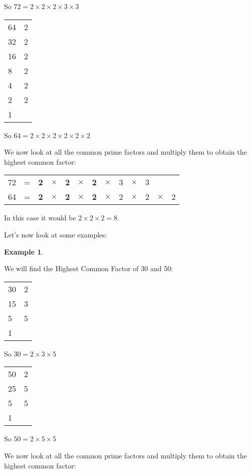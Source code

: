\documentclass[11pt, oneside]{article}
\theoremstyle{definition}
\newtheorem{exmp}{Example}[section]
\begin{document}
So $72 = 2 \times 2 \times 2 \times 3 \times 3$

\bigbreak

\begin{tabular}{ p{0.5cm} | p{1.5cm}}
64 & 2  \\
32 & 2  \\
16 & 2  \\
8 & 2  \\
4 & 2 \\
2 & 2 \\
1 
\end{tabular}

So $64 = 2 \times 2 \times 2 \times 2 \times 2 \times 2$

We now look at all the common prime factors and multiply them to obtain the highest common factor:

\begin{tabular}{c c c c c c c c c c c c c}
72 & = & {\bf2} & $\times $ & {\bf2} & $\times$  & {\bf2} & $\times$ & 3 & $\times $ & 3  &  &  \\
64 & = & {\bf2} & $\times $ & {\bf2} & $\times$  & {\bf2} & $\times$ & 2 & $\times $ & 2 & $\times $ & 2
\end{tabular}


In this case it would be $2\times 2\times 2 = 8$.

Let's now look at some examples:

\begin{exmp} \end{exmp}
We will find the Highest Common Factor of 30 and 50:

\begin{tabular}{ p{0.5cm} | p{1.5cm}}
30 & 2  \\
15 & 3  \\
5 & 5  \\
1 &  
\end{tabular}

So $30 = 2 \times 3 \times 5$

\bigbreak

\begin{tabular}{ p{0.5cm} | p{1.5cm}}
50 & 2  \\
25 & 5  \\
5 & 5  \\
1 
\end{tabular}

So $50 = 2 \times 5 \times 5$

We now look at all the common prime factors and multiply them to obtain the highest common factor:
\end{document}
